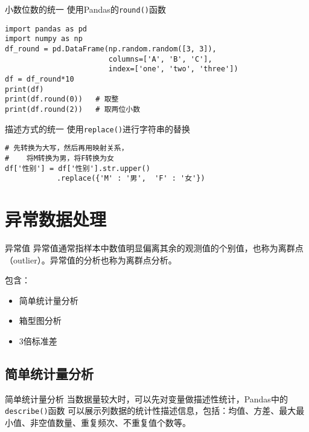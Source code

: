 \documentclass[t]{beamer}
\begin{document}
\begin{frame}[fragile]{小数位数的统一}
    使用Pandas的\verb|round()|函数
\begin{lstlisting}
import pandas as pd
import numpy as np
df_round = pd.DataFrame(np.random.random([3, 3]),
                        columns=['A', 'B', 'C'], 
                        index=['one', 'two', 'three'])
df = df_round*10
print(df)
print(df.round(0))   # 取整
print(df.round(2))   # 取两位小数
\end{lstlisting}

    
\end{frame}


\begin{frame}[fragile]{描述方式的统一}
使用\verb|replace()|进行字符串的替换
\begin{lstlisting}
# 先转换为大写，然后再用映射关系，
#    将M转换为男，将F转换为女
df['性别'] = df['性别'].str.upper()
            .replace({'M' : '男',  'F' : '女'})
\end{lstlisting}

\end{frame}

\section{异常数据处理}
\begin{frame}[fragile]{异常值}
异常值通常指样本中数值明显偏离其余的观测值的个别值，也称为离群点（outlier）。异常值的分析也称为离群点分析。

包含：
\begin{itemize}
    \item 简单统计量分析
    \item 箱型图分析
    \item 3倍标准差
\end{itemize}
\end{frame}

\subsection{简单统计量分析}


\begin{frame}[fragile]{简单统计量分析}
    当数据量较大时，可以先对变量做描述性统计，Pandas中的\verb|describe()|函数
    可以展示列数据的统计性描述信息，包括：均值、方差、最大最小值、非空值数量、重复频次、不重复值个数等。
\end{frame}
\end{document}
